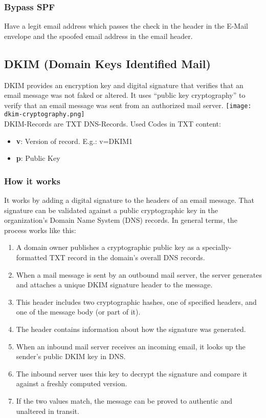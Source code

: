 \subsubsection{Bypass SPF}
Have a legit email address which passes the check in the header in the E-Mail envelope and the spoofed email address in the email header.


\subsection{DKIM (Domain Keys Identified Mail)}
DKIM provides an encryption key and digital signature that verifies that an email message was not faked or altered.
It uses ``public key cryptography'' to verify that an email message was sent from an authorized mail server.
\texttt{[image: dkim-cryptography.png]}\\

DKIM-Records are TXT DNS-Records. Used Codes in TXT content:
\begin{itemize}
  \item \textbf{v}: Version of record. E.g.: v=DKIM1
  \item \textbf{p}: Public Key
\end{itemize}

\subsubsection{How it works}
It works by adding a digital signature to the headers of an email message.
That signature can be validated against a public cryptographic key in the organization's Domain Name System (DNS) records. In general terms, the process works like this:\\

\begin{enumerate}
  \item A domain owner publishes a cryptographic public key as a specially-formatted TXT record in the domain's overall DNS records.
  \item When a mail message is sent by an outbound mail server, the server generates and attaches a unique DKIM signature header to the message.
  \item This header includes two cryptographic hashes, one of specified headers, and one of the message body (or part of it).
  \item The header contains information about how the signature was generated.
  \item When an inbound mail server receives an incoming email, it looks up the sender's public DKIM key in DNS.
  \item The inbound server uses this key to decrypt the signature and compare it against a freshly computed version.
  \item If the two values match, the message can be proved to authentic and unaltered in transit.
\end{enumerate}

